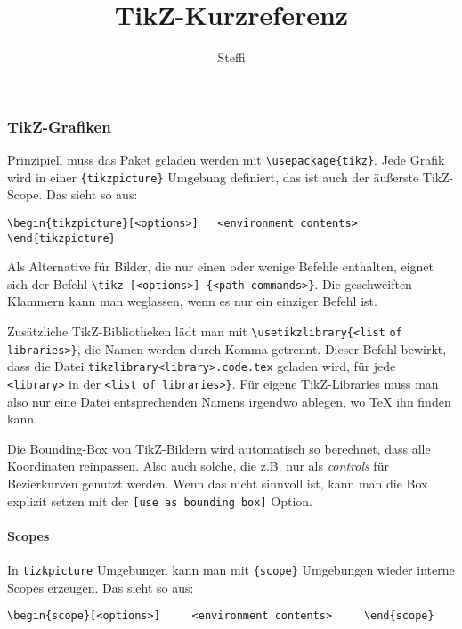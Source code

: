 \documentclass[a4paper,ngerman,10pt]{scrartcl}
\title{TikZ-Kurzreferenz}
\author{Steffi}
\begin{document}
 
\maketitle
\subsubsection*{TikZ-Grafiken}

Prinzipiell muss das Paket geladen werden mit \verb!\usepackage{tikz}!.
Jede Grafik wird in einer \verb!{tikzpicture}! Umgebung definiert, das ist auch der äußerste TikZ-Scope. Das sieht so aus: 

\begin{verbatim}\begin{tikzpicture}[<options>]   <environment contents>    \end{tikzpicture}\end{verbatim}

Als Alternative für Bilder, die nur einen oder wenige Befehle enthalten, eignet sich der Befehl 
\verb!\tikz!\texttt{ [<options>] }\verb!{<path commands>}!.
Die geschweiften Klammern kann man weglassen, wenn es nur ein einziger Befehl ist.

Zusätzliche TikZ-Bibliotheken lädt man mit \verb!\usetikzlibrary{<list! \verb!of! \verb!libraries>}!, die Namen werden durch Komma getrennt. Dieser Befehl bewirkt, dass die Datei \verb!tikzlibrary<library>.code.tex! geladen wird, für jede \verb!<library>! in der \verb!<list of libraries>}!. Für eigene TikZ-Libraries muss man also nur eine Datei entsprechenden Namens irgendwo ablegen, wo TeX ihn finden kann.

Die Bounding-Box von TikZ-Bildern wird automatisch so berechnet, dass alle Koordinaten reinpassen. Also auch solche, die z.B. nur als \emph{controls} für Bezierkurven genutzt werden. Wenn das nicht sinnvoll ist, kann man die Box explizit setzen mit der \verb![use as bounding box]! Option.

\paragraph*{Scopes}
In \verb!tizkpicture! Umgebungen kann man mit \verb!{scope}!  Umgebungen wieder interne Scopes erzeugen. Das sieht so aus:

\begin{verbatim}\begin{scope}[<options>]     <environment contents>     \end{scope}\end{verbatim}
\end{document}
